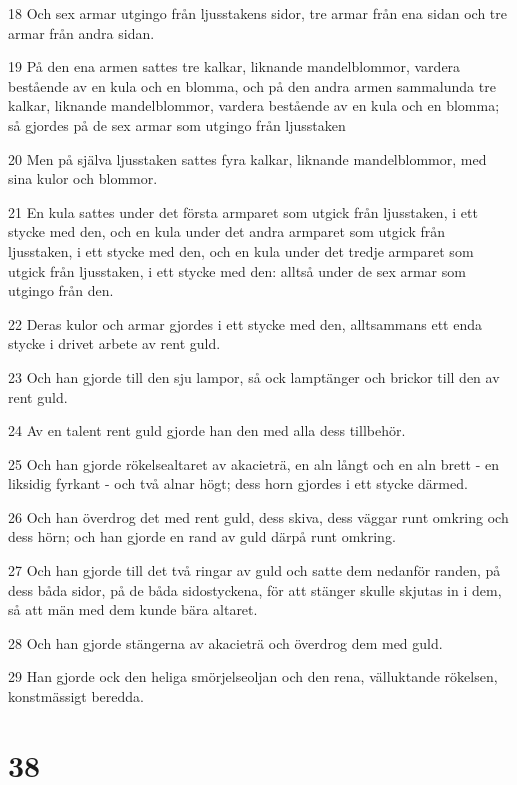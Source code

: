 \par 18 Och sex armar utgingo från ljusstakens sidor, tre armar från ena sidan och tre armar från andra sidan.
\par 19 På den ena armen sattes tre kalkar, liknande mandelblommor, vardera bestående av en kula och en blomma, och på den andra armen sammalunda tre kalkar, liknande mandelblommor, vardera bestående av en kula och en blomma; så gjordes på de sex armar som utgingo från ljusstaken
\par 20 Men på själva ljusstaken sattes fyra kalkar, liknande mandelblommor, med sina kulor och blommor.
\par 21 En kula sattes under det första armparet som utgick från ljusstaken, i ett stycke med den, och en kula under det andra armparet som utgick från ljusstaken, i ett stycke med den, och en kula under det tredje armparet som utgick från ljusstaken, i ett stycke med den: alltså under de sex armar som utgingo från den.
\par 22 Deras kulor och armar gjordes i ett stycke med den, alltsammans ett enda stycke i drivet arbete av rent guld.
\par 23 Och han gjorde till den sju lampor, så ock lamptänger och brickor till den av rent guld.
\par 24 Av en talent rent guld gjorde han den med alla dess tillbehör.
\par 25 Och han gjorde rökelsealtaret av akacieträ, en aln långt och en aln brett - en liksidig fyrkant - och två alnar högt; dess horn gjordes i ett stycke därmed.
\par 26 Och han överdrog det med rent guld, dess skiva, dess väggar runt omkring och dess hörn; och han gjorde en rand av guld därpå runt omkring.
\par 27 Och han gjorde till det två ringar av guld och satte dem nedanför randen, på dess båda sidor, på de båda sidostyckena, för att stänger skulle skjutas in i dem, så att män med dem kunde bära altaret.
\par 28 Och han gjorde stängerna av akacieträ och överdrog dem med guld.
\par 29 Han gjorde ock den heliga smörjelseoljan och den rena, välluktande rökelsen, konstmässigt beredda.

\chapter{38}


